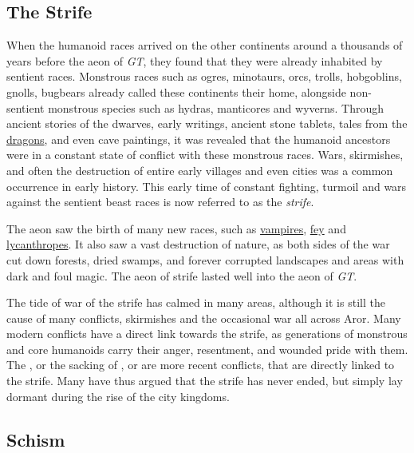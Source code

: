 \subsection{The Strife}
\label{sec:Strife}

When the humanoid races arrived on the other continents around a thousands of
years before the aeon of \emph{GT}, they found that they were already
inhabited by sentient races. Monstrous races such as ogres, minotaurs, orcs,
trolls, hobgoblins, gnolls, bugbears already called these continents their
home, alongside non-sentient monstrous species such as hydras, manticores and
wyverns. Through ancient stories of the dwarves, early writings, ancient stone
tablets, tales from the \hyperref[sec:Dragons]{dragons}, and even cave
paintings, it was revealed that the humanoid ancestors were in a constant
state of conflict with these monstrous races. Wars, skirmishes, and often the
destruction of entire early villages and even cities was a common occurrence
in early history. This early time of constant fighting, turmoil and wars
against the sentient beast races is now referred to as the \emph{strife}.

The aeon saw the birth of many new races, such as
\hyperref[sec:Vampires]{vampires}, \hyperref[sec:Fey]{fey} and
\hyperref[sec:Lycanthropes]{lycanthropes}. It also saw a vast destruction of
nature, as both sides of the war cut down forests, dried swamps, and forever
corrupted landscapes and areas with dark and foul magic. The aeon of strife
lasted well into the aeon of \emph{GT}.

The tide of war of the strife has calmed in many areas, although it is still
the cause of many conflicts, skirmishes and the occasional war all across
Aror.  Many modern conflicts have a direct link towards the strife, as
generations of monstrous and core humanoids carry their anger, resentment, and
wounded pride with them. The , or the sacking of
, or  are more recent conflicts,
that are directly linked to the strife. Many have thus argued that the strife
has never ended, but simply lay dormant during the rise of the city kingdoms.

\subsection{Schism}
\label{sec:Schism}

